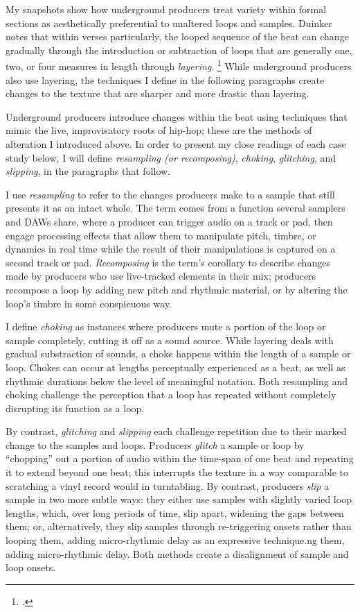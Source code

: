 My snapshots show how underground producers treat variety within formal sections as 
aesthetically preferential to unaltered loops and samples. Duinker notes that within verses 
particularly, the looped sequence of the beat can change gradually through the introduction
or subtraction of loops that are generally one, two, or four measures in length through
\emph{layering}. \footnote{
    \cite[96]{benduinkerSongFormMainstreaming2020}.} 
While underground producers also use layering, the techniques I define in the following
paragraphs create changes to the texture that are sharper and more drastic than layering.

Underground producers introduce changes within the beat using techniques that mimic the 
live, improvisatory roots of hip-hop; these are the methods of alteration I introduced 
above.  In order to present my close readings of each case study below, I will define 
\emph{resampling (or recomposing)}, \emph{choking}, \emph{glitching}, and \emph{slipping}, 
in the paragraphs that follow.

I use \emph{resampling} to refer to the changes producers make to a sample that still presents it 
as an intact whole. The term comes from a function several samplers and DAWs share, where a producer
can trigger audio on a track or pad, then engage processing effects that allow them to manipulate 
pitch, timbre, or dynamics in real time while the result of their manipulations is captured on a
second track or pad. \textit{Recomposing} is the term's corollary to describe changes made by
producers who use live-tracked elements in their mix; producers recompose a loop by adding new
pitch and rhythmic material, or by altering the loop's timbre in some conspicuous way.

I define \emph{choking} as instances where producers mute a portion of the loop or sample
completely, cutting it off as a sound source. While layering deals with gradual substraction
of sounds, a choke happens within the length of a sample or loop. Chokes can occur at lengths
perceptually experienced as a beat, as well as rhythmic durations below the level of meaningful
notation. Both resampling and choking challenge the perception that a loop has repeated without
completely disrupting its function as a loop.


\label{glitch}
By contrast, \emph{glitching} and \emph{slipping} each challenge repetition due to their marked 
change to the samples and loops. Producers \emph{glitch} a sample or loop by ``chopping'' out
a portion of audio within the time-span of one beat and repeating it to extend beyond one beat; 
this interrupts the texture in a way comparable to scratching a vinyl record would in turntabling. 
By contrast, producers \emph{slip} a sample in two more subtle ways: they either use samples with
slightly varied loop lengths, which, over long periods of time, slip apart, widening the gaps
between them; or, alternatively, they slip samples through re-triggering onsets rather than
looping them, adding micro-rhythmic delay as an expressive technique.ng them, adding micro-rhythmic 
delay. Both methods create a disalignment of sample and loop onsets.

